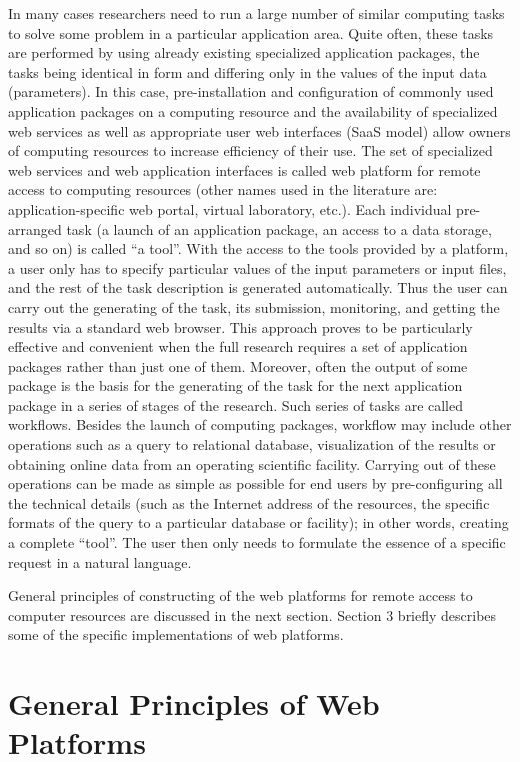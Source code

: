 \documentclass[procedia]{easychair}
\begin{document}
In many cases researchers need to run a large number of similar computing tasks to solve some problem in a particular application area. Quite often, these tasks are performed by using already existing specialized application packages, the tasks being identical in form and differing only in the values of the input data (parameters). In this case, pre-installation and configuration of commonly used application packages on a computing resource and the availability of specialized web services as well as appropriate user web interfaces (SaaS model) allow owners of computing resources to increase efficiency of their use. The set of specialized web services and web application interfaces is called web platform for remote access to computing resources (other names used in the literature are: application-specific web portal, virtual laboratory, etc.). Each individual pre-arranged task (a launch of an application package, an access to a data storage, and so on) is called ``a tool''. With the access to the tools provided by a platform, a user only has to specify particular values of the input parameters or input files, and the rest of the task description is generated automatically. Thus the user can carry out the generating of the task, its submission, monitoring, and getting the results via a standard web browser. This approach proves to be particularly effective and convenient when the full research requires a set of application packages rather than just one of them. Moreover, often the output of some package is the basis for the generating of the task for the next application package in a series of stages of the research. Such series of tasks are called workflows. Besides the launch of computing packages, workflow may include other operations such as a query to relational database, visualization of the results or obtaining online data from an operating scientific facility. Carrying out of these operations can be made as simple as possible for end users by pre-configuring all the technical details (such as the Internet address of the resources, the specific formats of the query to a particular database or facility); in other words, creating a complete ``tool''. The user then only needs to formulate the essence of a specific request in a natural language.

General principles of constructing of the web platforms for remote access to computer resources are discussed in the next section. Section 3 briefly describes some of the specific implementations of web platforms.
\section{General Principles of Web Platforms}
\label{sect:general_principles}
\end{document}
